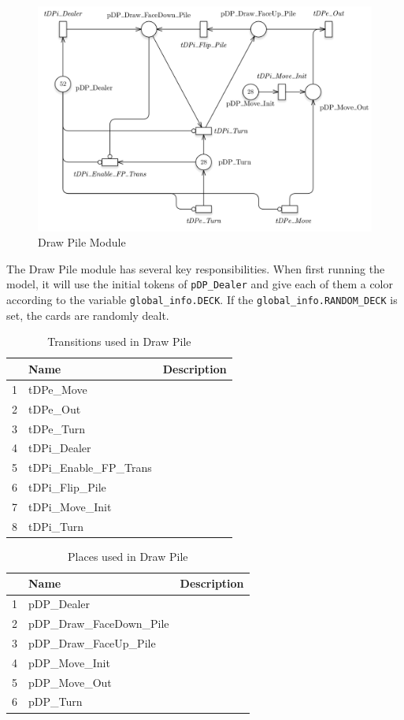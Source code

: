 \documentclass[runningheads,a4paper]{llncs}
\begin{document}
\begin{figure}
	\begin{center}
		\includegraphics[width=\textwidth]{images/drawPile}
		\caption{Draw Pile Module}
	\end{center}
\end{figure}
The Draw Pile module has several key responsibilities. When first running the model, it will use the initial tokens of \verb!pDP_Dealer! and give each of them a color according to the variable \verb!global_info.DECK!. If the \verb!global_info.RANDOM_DECK! is set, the cards are randomly dealt. 
\begin{table}
	\caption{Transitions used in Draw Pile}
	\begin{tabular}{|l|l|l|}
		\hline
		& Name & Description \\
		\hline
		1  & tDPe\_Move               &    \\ \hline
		2  & tDPe\_Out                &    \\ \hline
		3  & tDPe\_Turn               &    \\ \hline
		4  & tDPi\_Dealer             &    \\ \hline
		5  & tDPi\_Enable\_FP\_Trans  &    \\ \hline
		6  & tDPi\_Flip\_Pile         &    \\ \hline
		7  & tDPi\_Move\_Init         &    \\ \hline
		8  & tDPi\_Turn               &    \\ \hline
	\end{tabular}
\end{table}
\begin{table}
	\caption{Places used in Draw Pile}
	\begin{tabular}{|l|l|l|}
		\hline
		& Name & Description \\
		\hline
		1  & pDP\_Dealer               &  \\ \hline
		2  & pDP\_Draw\_FaceDown\_Pile &  \\ \hline
		3  & pDP\_Draw\_FaceUp\_Pile   &  \\ \hline
		4  & pDP\_Move\_Init           &  \\ \hline
		5  & pDP\_Move\_Out            &  \\ \hline
		6  & pDP\_Turn                 &  \\ \hline
	\end{tabular}
\end{table}
\end{document}
